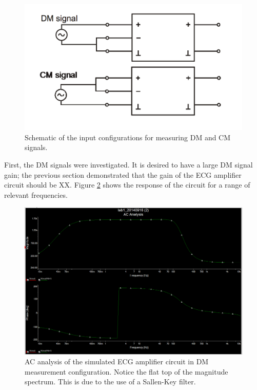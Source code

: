\documentclass[pdftex,12pt,letterpaper]{article}
\begin{document}
\begin{figure}[H]
\begin{center}
\includegraphics[scale=.5]{DM_CM.png}
\caption{Schematic of the input configurations for measuring DM and CM signals.}
\label{fig:DM_CM}
\end{center}
\end{figure}

First, the DM signals were investigated. It is desired to have a large DM signal gain; the previous section demonstrated that the gain of the ECG amplifier circuit should be XX. Figure \ref{fig:DM} shows the response of the circuit for a range of relevant frequencies. 

\begin{figure}[H]
\begin{center}
\includegraphics[scale=.35]{DM_analysis.png}
\caption{AC analysis of the simulated ECG amplifier circuit in DM measurement configuration. Notice the flat top of the magnitude spectrum. This is due to the use of a Sallen-Key filter.}
\label{fig:DM}
\end{center}
\end{figure}
\end{document}
